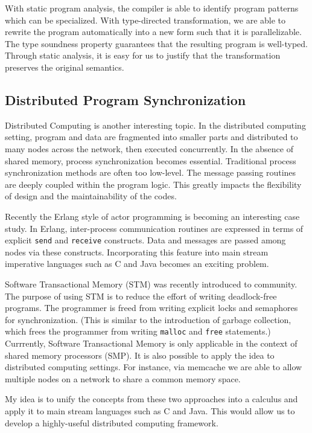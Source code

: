 \documentclass[12pt]{article}
\theoremstyle{plain} \numberwithin{equation}{section}
\theoremstyle{definition}
\newcommand{\comment}[1]{}
\begin{document}
With static program analysis, the compiler
is able to identify program patterns which can be specialized.
With type-directed transformation, we are able to rewrite the program 
automatically into a new form such that it is parallelizable. The 
type soundness property guarantees that the resulting program is
well-typed. Through static analysis, it is easy for us to justify that the
transformation preserves the original semantics.


\subsection{Distributed Program Synchronization}
Distributed Computing is another interesting topic. In the distributed
computing setting, program and data are fragmented into smaller parts and 
distributed to many nodes across the network, then executed concurrently. 
In the absence of shared
memory, process synchronization becomes essential. Traditional process
synchronization methods are often too low-level. The message passing routines
are deeply coupled within the program logic. This greatly impacts 
the flexibility of design and the maintainability of the codes.

Recently the Erlang \cite{erlang} style of actor programming is becoming
an interesting case study. In Erlang, inter-process communication
routines are expressed in terms of explicit {\tt send} and {\tt receive}
constructs. Data and messages are passed among nodes via these
constructs. Incorporating this feature into main stream imperative
languages such as C and Java becomes an exciting problem. 

Software Transactional Memory (STM) \cite{stm} was recently introduced to
community. The purpose of using STM is to reduce the effort of 
writing deadlock-free programs. The programmer is freed from 
writing explicit locks and semaphores for synchronization. (This is
similar to the introduction of garbage collection, which 
frees the programmer from writing {\tt malloc} and {\tt free} statements.) Currrently, Software Transactional Memory is only applicable in the context of 
shared memory processors (SMP). It is also possible to apply the
idea to distributed computing settings. For instance, via memcache
we are able to allow multiple nodes on a network to share a common
memory space.  

My idea is to unify the concepts from these two approaches into a
calculus and apply it to main stream languages such as C and Java. 
This would allow us to develop a highly-useful distributed computing framework.
\comment{
Recently, there have been some work \cite{cchr} which unifies the ideas of the 
above two projects. Via a notion of Concurrent Constraint Handling
Rules, it is possible to describe these two features in one single 
calculus. Therefore, there is ample of space we can explore the hybrid
approach of the two.
}






\newpage


\end{document}
